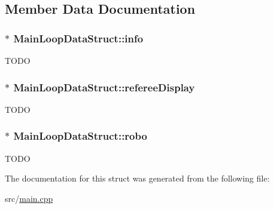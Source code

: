 \subsection{Member Data Documentation}
\hypertarget{structMainLoopDataStruct_ac4fccc92ef0456a58ec4841007534f3b}{
\subsubsection[{info}]{$\ast$ {\bf MainLoopDataStruct::info}}}
\label{structMainLoopDataStruct_ac4fccc92ef0456a58ec4841007534f3b}
TODO \hypertarget{structMainLoopDataStruct_aa273613df69e543077da8ce912276ac5}{
\subsubsection[{refereeDisplay}]{$\ast$ {\bf MainLoopDataStruct::refereeDisplay}}}
\label{structMainLoopDataStruct_aa273613df69e543077da8ce912276ac5}
TODO \hypertarget{structMainLoopDataStruct_a4d464e12c4d8f8ac1fc882c75753597b}{
\subsubsection[{robo}]{$\ast$ {\bf MainLoopDataStruct::robo}}}
\label{structMainLoopDataStruct_a4d464e12c4d8f8ac1fc882c75753597b}
TODO 

The documentation for this struct was generated from the following file:\begin{DoxyCompactItemize}
\item 
src/\hyperlink{main_8cpp}{main.cpp}\end{DoxyCompactItemize}
